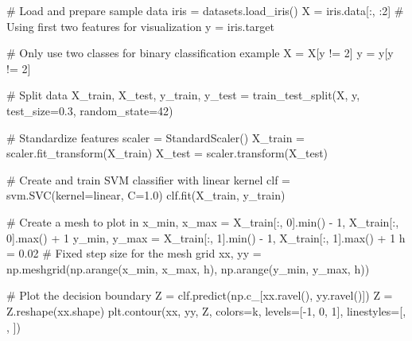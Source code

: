 \documentclass[
  letterpaper,
  DIV=11,
  numbers=noendperiod]{scrreprt}
\newenvironment{Shaded}{\begin{snugshade}}{\end{snugshade}}
\newcommand{\BuiltInTok}[1]{\textcolor[rgb]{0.00,0.23,0.31}{#1}}
\newcommand{\CommentTok}[1]{\textcolor[rgb]{0.37,0.37,0.37}{#1}}
\newcommand{\DecValTok}[1]{\textcolor[rgb]{0.68,0.00,0.00}{#1}}
\newcommand{\FloatTok}[1]{\textcolor[rgb]{0.68,0.00,0.00}{#1}}
\newcommand{\NormalTok}[1]{\textcolor[rgb]{0.00,0.23,0.31}{#1}}
\newcommand{\OperatorTok}[1]{\textcolor[rgb]{0.37,0.37,0.37}{#1}}
\newcommand{\StringTok}[1]{\textcolor[rgb]{0.13,0.47,0.30}{#1}}
\begin{document}
\begin{Shaded}
\begin{Highlighting}[]
\CommentTok{\# Load and prepare sample data}
\NormalTok{iris }\OperatorTok{=}\NormalTok{ datasets.load\_iris()}
\NormalTok{X }\OperatorTok{=}\NormalTok{ iris.data[:, :}\DecValTok{2}\NormalTok{]  }\CommentTok{\# Using first two features for visualization}
\NormalTok{y }\OperatorTok{=}\NormalTok{ iris.target}

\CommentTok{\# Only use two classes for binary classification example}
\NormalTok{X }\OperatorTok{=}\NormalTok{ X[y }\OperatorTok{!=} \DecValTok{2}\NormalTok{]}
\NormalTok{y }\OperatorTok{=}\NormalTok{ y[y }\OperatorTok{!=} \DecValTok{2}\NormalTok{]}

\CommentTok{\# Split data}
\NormalTok{X\_train, X\_test, y\_train, y\_test }\OperatorTok{=}\NormalTok{ train\_test\_split(X, y, test\_size}\OperatorTok{=}\FloatTok{0.3}\NormalTok{, random\_state}\OperatorTok{=}\DecValTok{42}\NormalTok{)}

\CommentTok{\# Standardize features}
\NormalTok{scaler }\OperatorTok{=}\NormalTok{ StandardScaler()}
\NormalTok{X\_train }\OperatorTok{=}\NormalTok{ scaler.fit\_transform(X\_train)}
\NormalTok{X\_test }\OperatorTok{=}\NormalTok{ scaler.transform(X\_test)}

\CommentTok{\# Create and train SVM classifier with linear kernel}
\NormalTok{clf }\OperatorTok{=}\NormalTok{ svm.SVC(kernel}\OperatorTok{=}\StringTok{\textquotesingle{}linear\textquotesingle{}}\NormalTok{, C}\OperatorTok{=}\FloatTok{1.0}\NormalTok{)}
\NormalTok{clf.fit(X\_train, y\_train)}

\CommentTok{\# Create a mesh to plot in}
\NormalTok{x\_min, x\_max }\OperatorTok{=}\NormalTok{ X\_train[:, }\DecValTok{0}\NormalTok{].}\BuiltInTok{min}\NormalTok{() }\OperatorTok{{-}} \DecValTok{1}\NormalTok{, X\_train[:, }\DecValTok{0}\NormalTok{].}\BuiltInTok{max}\NormalTok{() }\OperatorTok{+} \DecValTok{1}
\NormalTok{y\_min, y\_max }\OperatorTok{=}\NormalTok{ X\_train[:, }\DecValTok{1}\NormalTok{].}\BuiltInTok{min}\NormalTok{() }\OperatorTok{{-}} \DecValTok{1}\NormalTok{, X\_train[:, }\DecValTok{1}\NormalTok{].}\BuiltInTok{max}\NormalTok{() }\OperatorTok{+} \DecValTok{1}
\NormalTok{h }\OperatorTok{=} \FloatTok{0.02}  \CommentTok{\# Fixed step size for the mesh grid}
\NormalTok{xx, yy }\OperatorTok{=}\NormalTok{ np.meshgrid(np.arange(x\_min, x\_max, h),}
\NormalTok{                     np.arange(y\_min, y\_max, h))}

\CommentTok{\# Plot the decision boundary}
\NormalTok{Z }\OperatorTok{=}\NormalTok{ clf.predict(np.c\_[xx.ravel(), yy.ravel()])}
\NormalTok{Z }\OperatorTok{=}\NormalTok{ Z.reshape(xx.shape)}
\NormalTok{plt.contour(xx, yy, Z, colors}\OperatorTok{=}\StringTok{\textquotesingle{}k\textquotesingle{}}\NormalTok{, levels}\OperatorTok{=}\NormalTok{[}\OperatorTok{{-}}\DecValTok{1}\NormalTok{, }\DecValTok{0}\NormalTok{, }\DecValTok{1}\NormalTok{], linestyles}\OperatorTok{=}\NormalTok{[}\StringTok{\textquotesingle{}{-}{-}\textquotesingle{}}\NormalTok{, }\StringTok{\textquotesingle{}{-}\textquotesingle{}}\NormalTok{, }\StringTok{\textquotesingle{}{-}{-}\textquotesingle{}}\NormalTok{])}


\end{Highlighting}
\end{Shaded}
\end{document}
